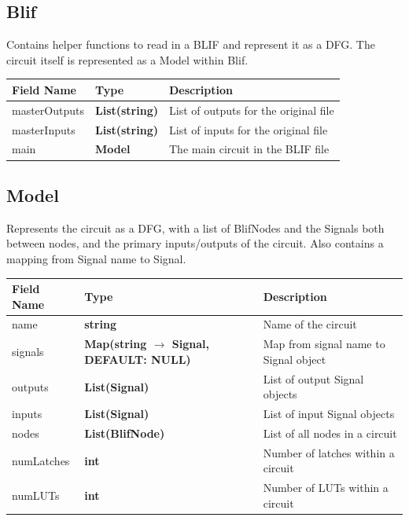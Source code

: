 \documentclass[12pt,final,oneside]{dwThesis} %
\begin{document}
   \subsection{Blif}
   Contains helper functions to read in a \ac{BLIF} and represent it as a \ac{DFG}.
   The circuit itself is represented as a Model within Blif.
   \begin{table}
      \begin{tabular}{lll}
         \toprule
         Field Name & Type & Description\\
         \midrule
         masterOutputs & \textbf{List(string)} & List of outputs for the original file \\
         masterInputs & \textbf{List(string)} & List of inputs for the original file \\
         main & \textbf{Model} & The main circuit in the \ac{BLIF} file\\
         \bottomrule
      \end{tabular}
   \end{table}

   \subsection{Model}
   Represents the circuit as a \ac{DFG}, with a list of BlifNodes and the Signals both between nodes, and the primary inputs/outputs of the circuit.
   Also contains a mapping from Signal name to Signal.
   \begin{table}
      \begin{tabularx}{\linewidth}{lXX}
         \toprule
         Field Name & Type & Description\\
         \midrule
         name & \textbf{string} & Name of the circuit \\
         signals & \textbf{Map(string $\to$ Signal, DEFAULT: NULL)} & Map from signal name to Signal object \\
         outputs & \textbf{List(Signal)} & List of output Signal objects \\
         inputs & \textbf{List(Signal)} & List of input Signal objects \\
         nodes & \textbf{List(BlifNode)} & List of all nodes in a circuit \\
         numLatches & \textbf{int} & Number of latches within a circuit \\
         numLUTs & \textbf{int} & Number of LUTs within a circuit \\
         \bottomrule
      \end{tabularx}
   \end{table}
\end{document}
